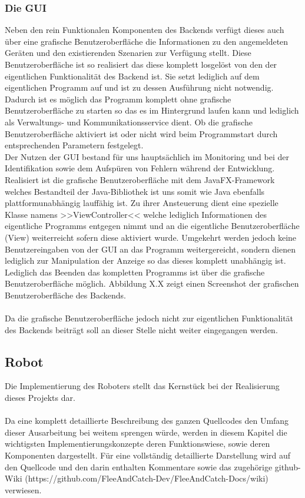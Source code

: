 \subsubsection{Die GUI}
Neben den rein Funktionalen Komponenten des Backends verfügt dieses auch über eine grafische Benutzeroberfläche die Informationen zu
den angemeldeten Geräten und den existierenden Szenarien zur Verfügung stellt. Diese Benutzeroberfläche ist so realisiert das diese 
komplett losgelöst von den der eigentlichen Funktionalität des Backend ist. Sie setzt lediglich auf dem eigentlichen Programm auf und
ist zu dessen Ausführung nicht notwendig. Dadurch ist es möglich das Programm komplett ohne grafische Benutzeroberfläche zu starten so
das es im Hintergrund laufen kann und lediglich als Verwaltungs- und Kommunikationsservice dient. Ob die grafische Benutzeroberfläche 
aktiviert ist oder nicht wird beim Programmstart durch entsprechenden Parametern festgelegt. \\
Der Nutzen der GUI bestand für uns hauptsächlich im Monitoring und bei der Identifikation sowie dem Aufspüren von Fehlern während der 
Entwicklung. \\
Realisiert ist die grafische Benutzeroberfläche mit dem JavaFX-Framework welches Bestandteil der Java-Bibliothek ist uns somit wie 
Java ebenfalls plattformunabhängig lauffähig ist. Zu ihrer Ansteuerung dient eine spezielle Klasse namens
>>ViewController<< welche lediglich Informationen des eigentliche Programms entgegen nimmt und an die eigentliche Benutzeroberfläche 
(View) weiterreicht sofern diese aktiviert wurde. Umgekehrt werden jedoch keine Benutzereingaben von der GUI an das Programm 
weitergereicht, sondern dienen lediglich zur Manipulation der Anzeige so das dieses komplett unabhängig ist. Lediglich das Beenden 
das kompletten Programms ist über die grafische Benutzeroberfläche möglich.
Abbildung X.X zeigt einen Screenshot der grafischen Benutzeroberfläche des Backends. \\
\\
Da die grafische Benutzeroberfläche jedoch nicht zur eigentlichen Funktionalität des Backends beiträgt soll an dieser Stelle nicht 
weiter eingegangen werden.

\subsection{Robot}
Die Implementierung des Roboters stellt das Kernstück bei der Realisierung dieses Projekts dar. 
\\
\\
Da eine komplett detaillierte Beschreibung des ganzen Quellcodes den Umfang dieser Ausarbeitung bei weitem sprengen würde,
werden in diesem Kapitel die wichtigsten Implementierungskonzepte deren Funktionswiese, sowie deren Komponenten dargestellt. 
Für eine vollständig detaillierte Darstellung wird auf den Quellcode und den darin enthalten Kommentare sowie das zugehörige 
github-Wiki (https://github.com/FleeAndCatch-Dev/FleeAndCatch-Docs/wiki) verwiesen.
